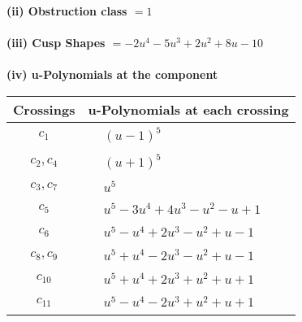 \documentclass[1p]{elsarticle_modified}
\theoremstyle{definition}
\begin{document}
\flushleft \textbf{(ii) Obstruction class $= 1$}\\~\\
\flushleft \textbf{(iii) Cusp Shapes $= -2 u^4-5 u^3+2 u^2+8 u-10$}\\~\\
\newpage\renewcommand{\arraystretch}{1}
\flushleft \textbf{(iv) u-Polynomials at the component}\newline \\
\begin{tabular}{m{50pt}|m{274pt}}
Crossings & \hspace{64pt}u-Polynomials at each crossing \\
\hline $$\begin{aligned}c_{1}\end{aligned}$$&$\begin{aligned}
&(u-1)^5
\end{aligned}$\\
\hline $$\begin{aligned}c_{2},c_{4}\end{aligned}$$&$\begin{aligned}
&(u+1)^5
\end{aligned}$\\
\hline $$\begin{aligned}c_{3},c_{7}\end{aligned}$$&$\begin{aligned}
&u^5
\end{aligned}$\\
\hline $$\begin{aligned}c_{5}\end{aligned}$$&$\begin{aligned}
&u^5-3 u^4+4 u^3- u^2- u+1
\end{aligned}$\\
\hline $$\begin{aligned}c_{6}\end{aligned}$$&$\begin{aligned}
&u^5- u^4+2 u^3- u^2+u-1
\end{aligned}$\\
\hline $$\begin{aligned}c_{8},c_{9}\end{aligned}$$&$\begin{aligned}
&u^5+u^4-2 u^3- u^2+u-1
\end{aligned}$\\
\hline $$\begin{aligned}c_{10}\end{aligned}$$&$\begin{aligned}
&u^5+u^4+2 u^3+u^2+u+1
\end{aligned}$\\
\hline $$\begin{aligned}c_{11}\end{aligned}$$&$\begin{aligned}
&u^5- u^4-2 u^3+u^2+u+1
\end{aligned}$\\
\hline
\end{tabular}\\~\\
\end{document}
